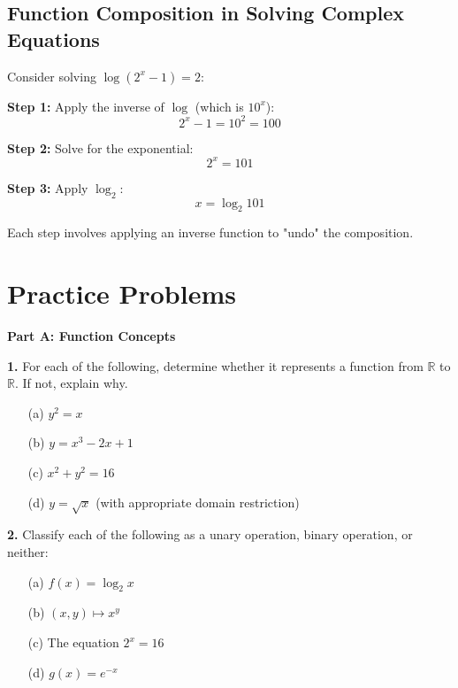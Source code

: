 \documentclass[12pt]{article}
\begin{document}
\subsection{Function Composition in Solving Complex Equations}

Consider solving $\log(2^x - 1) = 2$:

\textbf{Step 1:} Apply the inverse of $\log$ (which is $10^x$):
$$2^x - 1 = 10^2 = 100$$

\textbf{Step 2:} Solve for the exponential:
$$2^x = 101$$

\textbf{Step 3:} Apply $\log_2$:
$$x = \log_2 101$$

Each step involves applying an inverse function to "undo" the composition.

\newpage

\section{Practice Problems}

\textbf{Part A: Function Concepts}

\textbf{1.} For each of the following, determine whether it represents a function from $\mathbb{R}$ to $\mathbb{R}$. If not, explain why.

\begin{enumerate}
\item[(a)] $y^2 = x$
\vspace{2cm}

\item[(b)] $y = x^3 - 2x + 1$  
\vspace{2cm}

\item[(c)] $x^2 + y^2 = 16$
\vspace{2cm}

\item[(d)] $y = \sqrt{x}$ (with appropriate domain restriction)
\vspace{2cm}
\end{enumerate}

\textbf{2.} Classify each of the following as a unary operation, binary operation, or neither:

\begin{enumerate}
\item[(a)] $f(x) = \log_2 x$
\vspace{1cm}

\item[(b)] $(x,y) \mapsto x^y$
\vspace{1cm}

\item[(c)] The equation $2^x = 16$
\vspace{1cm}

\item[(d)] $g(x) = e^{-x}$
\vspace{1cm}
\end{enumerate}
\end{document}
